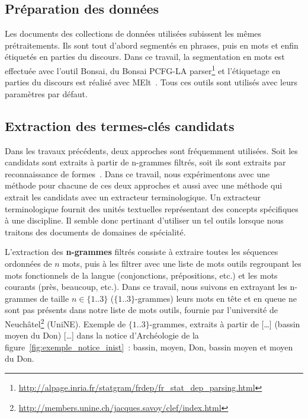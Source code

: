   \subsection{Préparation des données}
  \label{subsec:preparation_des_donnees}
    Les documents des collections de données utilisées subissent les mêmes
    prétraitements. Ils sont tout d'abord segmentés en phrases, puis en mots et
    enfin étiquetés en parties du discours. Dans ce travail, la segmentation en
    mots est effectuée avec l'outil Bonsai, du Bonsai PCFG-LA
    parser\footnote{\url{http://alpage.inria.fr/statgram/frdep/fr_stat_dep_parsing.html}}
    et l'étiquetage en parties du discours est réalisé avec
    MElt~\cite{denis2009melt}. Tous ces outils sont utilisés avec leurs
    paramètres par défaut.

  \subsection{Extraction des termes-clés candidats}
  \label{subsec:extraction_de_termes_cles_candidats}
    Dans les travaux précédents, deux approches sont fréquemment utilisées. Soit
    les candidats sont extraits à partir de n-grammes filtrés, soit ils sont
    extraits par reconnaissance de formes~\cite{hulth2003keywordextraction}.
    Dans ce travail, nous expérimentons avec une méthode pour chacune de ces
    deux approches et aussi avec une méthode qui extrait les candidats avec un 
    extracteur terminologique. Un extracteur terminologique fournit des
    unités textuelles représentant des concepts spécifiques à une discipline. Il
    semble donc pertinant d'utiliser un tel outils lorsque nous traitons des
    documents de domaines de spécialité.

    L'extraction des \textbf{n-grammes} filtrés consiste à extraire toutes les
    séquences ordonnées de $n$ mots, puis à les filtrer avec une liste de mots
    outils regroupant les mots fonctionnels de la langue (conjonctions,
    prépositions, etc.) et les mots courants (\og{}près\fg{},
    \og{}beaucoup\fg{}, etc.). Dans ce travail, nous suivons
     en extrayant les n-grammes de taille
    $n \in \{1..3\}$ ($\{1..3\}$-grammes) leurs mots en tête et en queue ne
    sont pas présents dans notre liste de mots outils, fournie par l'université
    de
    Neuchâtel\footnote{\url{http://members.unine.ch/jacques.savoy/clef/index.html}}
    (UniNE). Exemple de $\{1..3\}$-grammes, extraits à partir de \og{}[\dots]
    (bassin moyen du Don) [\dots]\fg{} dans la notice d'Archéologie de la
    figure~\ref{fig:exemple_notice_inist}~: \og{}bassin\fg{}, \og{}moyen\fg{},
    \og{}Don\fg{}, \og{}bassin moyen\fg{} et \og{}moyen du Don\fg{}.

